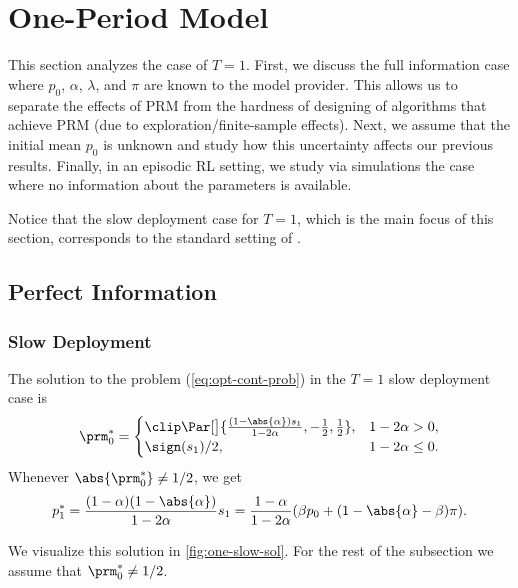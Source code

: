 \section{One-Period Model}
\label{sec:one_period}

This section analyzes the case of $T=1$. First, we discuss the full information
case where $p_0$, $\alpha$, $\lambda$, and $\pi$ are known to the model
provider. This allows us to separate the effects of PRM
from the hardness of designing of algorithms that achieve PRM (due to exploration/finite-sample effects). Next, we assume that the initial mean $p_0$ is unknown and study how this
uncertainty affects our previous results. Finally, in an episodic RL
setting, we study via simulations the case where no information about the
parameters is available. 

Notice that the slow deployment case for $T=1$, which
is the main focus of this section, corresponds to the standard setting of
\cite{p20p}.

\subsection{Perfect Information}

\subsubsection{Slow Deployment}
\label{sec:one-slow}

\begin{proposition}
    \label{thm:one-slow-sol}
    The solution to the problem (\ref{eq:opt-cont-prob}) in the $T=1$ slow deployment case is
    \[
        \prm^*_0 =
        \begin{cases}
            \clip\Par[\big]{\frac{(1 - \abs{\alpha}) s_1}{1 - 2 \alpha},
            -\frac{1}{2}, \frac{1}{2}}, & 1 - 2 \alpha > 0,\\
            \sign(s_1) / 2, & 1 - 2 \alpha \le 0.
        \end{cases}
    \]
    Whenever $\abs{\prm^*_0} \neq 1 / 2$, we get
    \[
        p^*_1 = \frac{(1 - \alpha) (1 - \abs{\alpha})}{1 - 2 \alpha} s_1 =
        \frac{1 - \alpha}{1 - 2 \alpha} (\beta p_0 + (1 - \abs{\alpha} - \beta)
        \pi).
    \]
\end{proposition}

We visualize this solution in \cref{fig:one-slow-sol}. For the rest of the subsection we assume that $\prm^*_0 \neq 1/2$.

